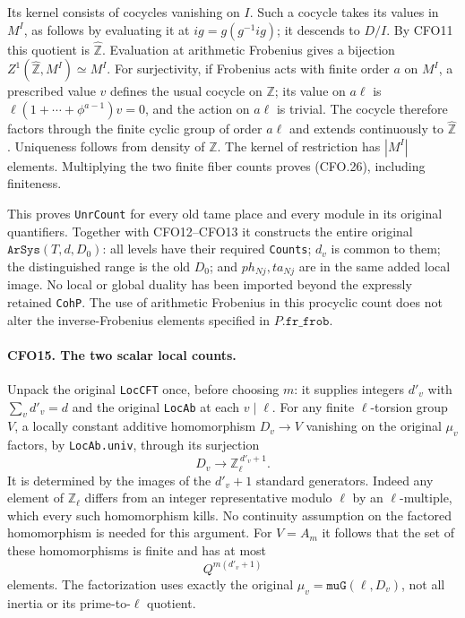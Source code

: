 Its kernel consists of cocycles vanishing on $I$.
Such a cocycle takes its values in $M^I$, as follows by
evaluating it at $ig=g(g^{-1}ig)$; it descends to $D/I$.
By CFO11 this quotient is $\widehat{\mathbb Z}$.
Evaluation at arithmetic Frobenius gives a bijection
$Z^1(\widehat{\mathbb Z},M^I)\simeq M^I$.
For surjectivity, if Frobenius acts with finite order
$a$ on $M^I$, a prescribed value $v$ defines the usual
cocycle on $\mathbb Z$; its value on $a\ell$ is
$\ell(1+\cdots+\phi^{a-1})v=0$, and the action on
$a\ell$ is trivial.  The cocycle therefore factors through
the finite cyclic group of order $a\ell$ and extends
continuously to $\widehat{\mathbb Z}$.  Uniqueness follows
from density of $\mathbb Z$.  The kernel of restriction
has $|M^I|$ elements.  Multiplying the two finite fiber
counts proves (CFO.26), including finiteness.

This proves \texttt{UnrCount} for every old tame place
and every module in its original quantifiers.  Together
with CFO12--CFO13 it constructs the entire original
$\texttt{ArSys}(T,d,D_0)$: all levels have their required
\texttt{Counts}; $d_v$ is common to them; the distinguished
range is the old $D_0$; and $ph_{Nj},ta_{Nj}$ are in the
same added local image.  No local or global duality has
been imported beyond the expressly retained
\texttt{CohP}.  The use of arithmetic Frobenius in this
procyclic count does not alter the inverse-Frobenius
elements specified in $P.\texttt{fr\_frob}$.

\paragraph{CFO15. The two scalar local counts.}
\label{claim:CFO15}
Unpack the original \texttt{LocCFT} once, before choosing $m$:
it supplies integers $d'_v$ with $\sum_v d'_v=d$ and the
original \texttt{LocAb} at each $v\mid\ell$.  For any finite
$\ell$-torsion group $V$, a locally constant additive
homomorphism $D_v\to V$ vanishing on the original $\mu_v$
factors, by \texttt{LocAb.univ}, through its surjection
\[
             D_v\longrightarrow\mathbb Z_\ell^{\,d'_v+1}.
 \]
It is determined by the images of the $d'_v+1$ standard
generators.  Indeed any element of $\mathbb Z_\ell$ differs
from an integer representative modulo $\ell$ by an
$\ell$-multiple, which every such homomorphism kills.
No continuity assumption on the factored homomorphism is
needed for this argument.  For $V=A_m$ it follows that the
set of these homomorphisms is finite and has at most
\[
                         Q^{m(d'_v+1)}                         \tag{CFO.27}
\]
elements.  The factorization uses exactly the original
$\mu_v=\texttt{muG}(\ell,D_v)$, not all inertia or its
prime-to-$\ell$ quotient.

